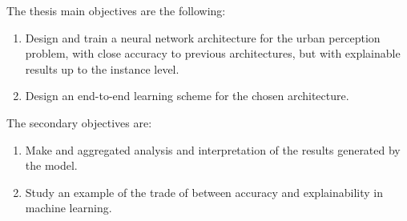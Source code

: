 The thesis main objectives are the following:
\begin{enumerate}
    \item Design and train a neural network architecture for the urban perception problem,
    with close accuracy to previous architectures, but with explainable results up to the instance level.
    \item Design an end-to-end learning scheme for the chosen architecture.
\end{enumerate}

The secondary objectives are:

\begin{enumerate}
    \item Make and aggregated analysis and interpretation of the results generated by the model.
    \item Study an example of the trade of between accuracy and explainability in machine learning.
\end{enumerate}